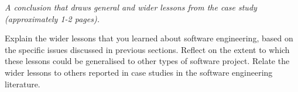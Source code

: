 \documentclass[../dissertation.tex]{subfiles}
\begin{document}
\textit{A conclusion that draws general and wider lessons from the case study (approximately 1-2 pages).}

Explain the wider lessons that you learned about software engineering,
based on the specific issues discussed in previous sections.  Reflect
on the extent to which these lessons could be generalised to other
types of software project.  Relate the wider lessons to others
reported in case studies in the software engineering literature.
\end{document}
